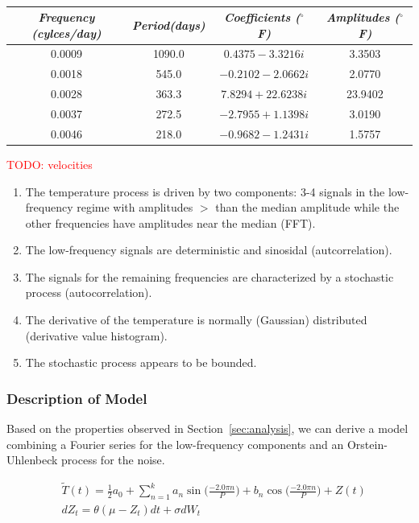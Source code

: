 \documentclass[11pt, letterpaper]{article}
\begin{document}
\begin{table}[H]
  \centering
  \begin{tabular}{c c c c} \hline
  \emph{Frequency (cylces/day)} & \emph{Period(days)} & \emph{Coefficients ($^{\circ}$ F)} & \emph{Amplitudes ($^{\circ}$ F)}\\ \hline
  0.0009 & 1090.0 & $0.4375-3.3216i$ & 3.3503 \\ \hline
  0.0018 & 545.0 & $-0.2102-2.0662i$ & 2.0770 \\ \hline
  0.0028 & 363.3 & $7.8294+22.6238i$ & 23.9402 \\ \hline
  0.0037 & 272.5 & $-2.7955+1.1398i$ & 3.0190 \\ \hline
  0.0046 & 218.0 & $-0.9682-1.2431i$ & 1.5757 \\ \hline
  \end{tabular}
  \caption{}
  \label{tab:analysis-ft-values}
\end{table}

\textcolor{red}{TODO: velocities}

\begin{enumerate}
\item The temperature process is driven by two components: 3-4 signals in the low-frequency regime with amplitudes $>$ than the median amplitude while the other frequencies have amplitudes near the median (FFT).
\item The low-frequency signals are deterministic and sinosidal (autcorrelation).
\item The signals for the remaining frequencies are characterized by a stochastic process (autocorrelation).
\item The derivative of the temperature is normally (Gaussian) distributed (derivative value histogram).
\item The stochastic process appears to be bounded.
\end{enumerate}



\subsubsection{Description of Model}
Based on the properties observed in Section~\ref{sec:analysis}, we can derive a model combining a Fourier series for the low-frequency components and an Orstein-Uhlenbeck process for the noise.

\begin{align}
&\tilde{T}(t) = \frac{1}{2}a_0 + \sum_{n=1}^k a_n \sin\Big(\frac{-2.0 \pi n}{P}\Big) + b_n \cos\Big(\frac{-2.0 \pi n}{P}\Big) + Z(t) \\
&dZ_t = \theta (\mu - Z_t)dt + \sigma dW_t
\end{align}
\end{document}
